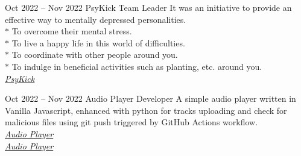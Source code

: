 \documentclass[
	10pt, %
	]{FreemanCV}
\begin{document}
\begin{paracol}{2}

\jobentry
	{Oct 2022 -- Nov 2022} %
	{} %
	{PsyKick} %
	{Team Leader} %
	{It was an initiative to provide an effective way to mentally depressed personalities.\\
	 $*$ To overcome their mental stress.\\
	 $*$ To live a happy life in this world of difficulties.\\
	 $*$ To coordinate with other people around you.\\
	 $*$ To indulge in beneficial activities such as planting, etc. around you.\\
	 \raisebox{-1pt}{\faGithubSquare} \href{https://github.com/PsyKick-MIT}{\textit{PsyKick}}} %


\jobentry
	{Oct 2022 -- Nov 2022} %
	{} %
	{Audio Player} %
	{Developer} %
	{A simple audio player written in Vanilla Javascript, enhanced with python for tracks uploading and check for malicious files using git push triggered by GitHub Actions workflow.\\
	\raisebox{-1pt}{\faGithubSquare} \href{https://github.com/AndroiableDroid/audioplayer}{\textit{Audio Player}}\\
	\raisebox{-1pt}{\faGlobe} \href{https://github.com/AndroiableDroid/audioplayer}{\textit{Audio Player}}} %





\end{paracol}
\end{document}
